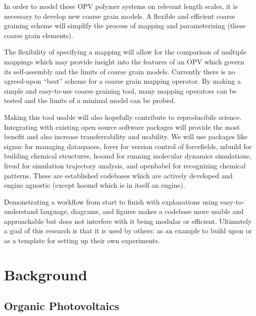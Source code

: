 In order to model these OPV polymer systems on relevant length scales, it is necessary to develop new coarse grain models.
A flexible and efficient coarse graining scheme will simplify the process of mapping and parameterizing (these coarse grain elements). %

The flexibility of specifying a mapping will allow for the comparison of multiple mappings which may provide insight into the features of an OPV which govern its self-assembly and the limits of coarse grain models.
Currently there is no agreed-upon ``best'' scheme for a coarse grain mapping operator.
By making a simple and easy-to-use coarse graining tool, many mapping operators can be tested and the limits of a minimal model can be probed.

Making this tool usable will also hopefully contribute to reproducibile science. 
Integrating with existing open source software packages will provide the most benefit and also increase transferrability and usability.
We will use packages like signac for managing dataspaces, foyer for version control of forcefields, mbuild for building chemical structures, hoomd for running molecular dynamics simulations, freud for simulation trajectory analysis, and openbabel for recognizing chemical patterns. %
These are established codebases which are actively developed and engine agnostic (except hoomd which is in itself an engine).

Demonstrating a workflow from start to finish with explanations using easy-to-understand language, diagrams, and figures makes a codebase more usable and approachable but does not interfere with it being modular or efficient.
Ultimately a goal of this research is that it is used by others: as an example to build upon or as a template for setting up their own experiments.

\section*{Background}

\subsection*{Organic Photovoltaics}

